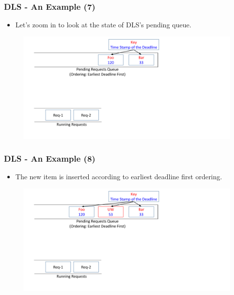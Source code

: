 \documentclass{beamer}
\begin{document}
\begin{frame}
  \frametitle{DLS - An Example (7)}
  \begin{itemize}
  \item Let's zoom in to look at the state of DLS's pending queue.
    \newline
    \newline
  \end{itemize}
  \begin{figure}
    \begin{center}
      \centerline{\includegraphics[scale=0.33]{img/DLS_Example8_1.png}}
    \end{center}
  \end{figure}
\end{frame}

\begin{frame}
  \frametitle{DLS - An Example (8)}
  \begin{itemize}
  \item The new item is inserted according to earliest deadline first ordering.
    \newline
  \end{itemize}
  \begin{figure}
    \begin{center}
      \centerline{\includegraphics[scale=0.33]{img/DLS_Example8_2.png}}
    \end{center}
  \end{figure}
\end{frame}
\end{document}
